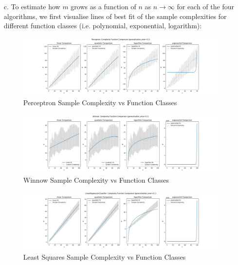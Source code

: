 \documentclass[12pt]{article}
\begin{document}
\begin{itemize}
\newpage
    \item[c.] To estimate how $m$ grows as a function of $n$ as $n \rightarrow \infty$ for each of the four algorithms, we first visualise lines of best fit of the sample complexities for different function classes (i.e. polynomial, exponential, logarithm):


    \begin{figure}[h]
    \centering
    \includegraphics[scale=0.35]{outputs/part3/q1a_perceptron_complexity_function_comparison.png}
    \caption{Perceptron Sample Complexity vs Function Classes}
    \label{fig:18}
    \end{figure}

    \begin{figure}[h]
    \centering
    \includegraphics[scale=0.35]{outputs/part3/q1a_winnow_complexity_function_comparison.png}
    \caption{Winnow Sample Complexity vs Function Classes}
    \label{fig:19}
    \end{figure}
\newpage
    \begin{figure}[h]
    \centering
    \includegraphics[scale=0.35]{outputs/part3/q1a_lin_reg_complexity_function_comparison.png}
    \caption{Least Squares Sample Complexity vs Function Classes}
    \label{fig:21}
    \end{figure}


\end{itemize}
\end{document}
